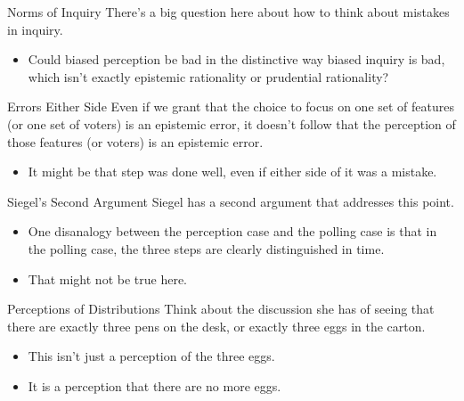 \documentclass[
  17pt,
  letterpaper,
  ignorenonframetext,
  aspectratio=169,
  xcolor={dvipsnames}]{beamer}
\providecommand{\tightlist}{%
  \setlength{\itemsep}{0pt}\setlength{\parskip}{0pt}}\usepackage{longtable,booktabs,array}
\begin{document}
\begin{frame}{Norms of Inquiry}
\protect\hypertarget{norms-of-inquiry-1}{}
There's a big question here about how to think about mistakes in
inquiry.

\begin{itemize}[<+->]
\tightlist
\item
  Could biased perception be bad in the distinctive way biased inquiry
  is bad, which isn't exactly epistemic rationality or prudential
  rationality?
\end{itemize}
\end{frame}

\begin{frame}{Errors Either Side}
\protect\hypertarget{errors-either-side}{}
Even if we grant that the choice to focus on one set of features (or one
set of voters) is an epistemic error, it doesn't follow that the
perception of those features (or voters) is an epistemic error.

\begin{itemize}[<+->]
\tightlist
\item
  It might be that step was done well, even if either side of it was a
  mistake.
\end{itemize}
\end{frame}

\begin{frame}{Siegel's Second Argument}
\protect\hypertarget{siegels-second-argument}{}
Siegel has a second argument that addresses this point.

\begin{itemize}[<+->]
\tightlist
\item
  One disanalogy between the perception case and the polling case is
  that in the polling case, the three steps are clearly distinguished in
  time.
\item
  That might not be true here.
\end{itemize}
\end{frame}

\begin{frame}{Perceptions of Distributions}
\protect\hypertarget{perceptions-of-distributions}{}
Think about the discussion she has of seeing that there are exactly
three pens on the desk, or exactly three eggs in the carton.

\begin{itemize}[<+->]
\tightlist
\item
  This isn't just a perception of the three eggs.
\item
  It is a perception that there are no more eggs.
\end{itemize}
\end{frame}
\end{document}
